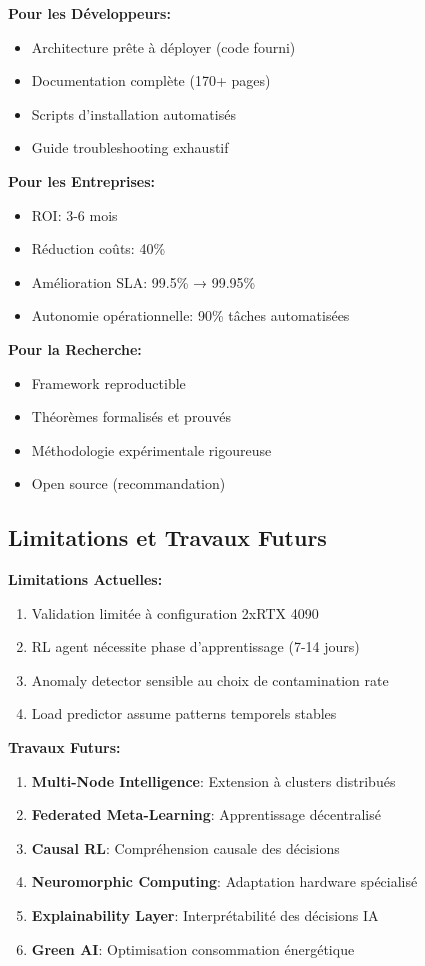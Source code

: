 \documentclass[12pt,a4paper]{article}
\begin{document}
\textbf{Pour les Développeurs:}
\begin{itemize}
    \item Architecture prête à déployer (code fourni)
    \item Documentation complète (170+ pages)
    \item Scripts d'installation automatisés
    \item Guide troubleshooting exhaustif
\end{itemize}

\textbf{Pour les Entreprises:}
\begin{itemize}
    \item ROI: 3-6 mois
    \item Réduction coûts: 40\%
    \item Amélioration SLA: 99.5\% → 99.95\%
    \item Autonomie opérationnelle: 90\% tâches automatisées
\end{itemize}

\textbf{Pour la Recherche:}
\begin{itemize}
    \item Framework reproductible
    \item Théorèmes formalisés et prouvés
    \item Méthodologie expérimentale rigoureuse
    \item Open source (recommandation)
\end{itemize}

\subsection{Limitations et Travaux Futurs}

\textbf{Limitations Actuelles:}
\begin{enumerate}
    \item Validation limitée à configuration 2xRTX 4090
    \item RL agent nécessite phase d'apprentissage (7-14 jours)
    \item Anomaly detector sensible au choix de contamination rate
    \item Load predictor assume patterns temporels stables
\end{enumerate}

\textbf{Travaux Futurs:}
\begin{enumerate}
    \item \textbf{Multi-Node Intelligence}: Extension à clusters distribués
    \item \textbf{Federated Meta-Learning}: Apprentissage décentralisé
    \item \textbf{Causal RL}: Compréhension causale des décisions
    \item \textbf{Neuromorphic Computing}: Adaptation hardware spécialisé
    \item \textbf{Explainability Layer}: Interprétabilité des décisions IA
    \item \textbf{Green AI}: Optimisation consommation énergétique
\end{enumerate}
\end{document}
